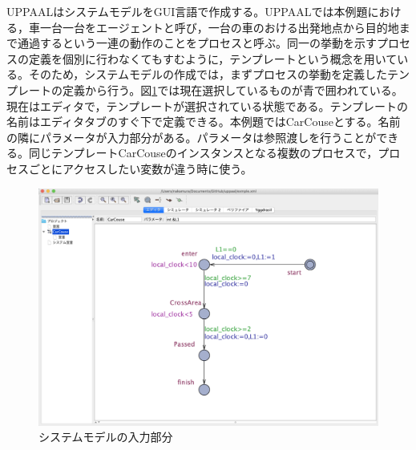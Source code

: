 \documentclass{tpu-sotu}
\begin{document}
	UPPAALはシステムモデルをGUI言語で作成する。UPPAALでは本例題における，車一台一台をエージェントと呼び，一台の車のおける出発地点から目的地まで通過するという一連の動作のことをプロセスと呼ぶ。同一の挙動を示すプロセスの定義を個別に行わなくてもすむように，テンプレートという概念を用いている。そのため，システムモデルの作成では，まずプロセスの挙動を定義したテンプレートの定義から行う。図\ref{CC}では現在選択しているものが青で囲われている。現在はエディタで，テンプレートが選択されている状態である。テンプレートの名前はエディタタブのすぐ下で定義できる。本例題ではCarCouseとする。名前の隣にパラメータが入力部分がある。パラメータは参照渡しを行うことができる。同じテンプレートCarCouseのインスタンスとなる複数のプロセスで，プロセスごとにアクセスしたい変数が違う時に使う。
	\begin{figure}[htbp]
	\centering
	\includegraphics[width=145mm]{CarCouse.png}
	\caption{システムモデルの入力部分}
	\label{CC}
	\end{figure}
	
\end{document}
